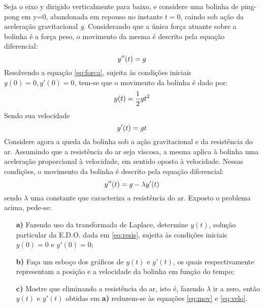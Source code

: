 \linespread{1.5}
Seja o eixo y dirigido verticalmente para baixo, e considere uma bolinha de ping-pong em y=0, abandonada em repouso no instante $t=0$, caindo sob ação da aceleração gravitacional \textit{g}. Considerando que a única força atuante sobre a bolinha é a força peso, o movimento da mesma é descrito pela equação diferencial:
\begin{equation}
    \centering
    \label{eq:forca}
    y''(t) = g
\end{equation}
Resolvendo a equação \ref{eq:forca}, sujeita às condições iniciais $y(0)=0, y'(0) = 0$, tem-se que o movimento da bolinha é dado por:
\begin{equation}
    \centering
    \label{eq:mov}
    y(t) = \frac{1}{2}gt^2
\end{equation}
Sendo sua velocidade
\begin{equation}
    \centering
    \label{eq:velo}
    y'(t) = gt
\end{equation}
Considere agora a queda da bolinha sob a ação gravitacional e da resistência do ar. Assumindo que a resistência do ar seja viscosa, a mesma aplica à bolinha uma aceleração proporcional à velocidade, em sentido oposto à velocidade. Nessas condições, o movimento da bolinha é descrito pela equação diferencial:
\begin{equation}
    \centering
    \label{eq:resis}
    y''(t) = g - \lambda y'(t)
\end{equation}
sendo $\lambda$ uma constante que caracteriza a resistência do ar. Exposto o problema acima, pede-se:
\begin{itemize}
    \item[\textbf{a)}] Fazendo uso da transformada de Laplace, determine $y(t)$, solução particular da E.D.O. dada em \ref{eq:resis}, sujeita às condições iniciais $y(0) = 0$ e $y'(0) = 0$;
    \item[\textbf{b)}] Faça um esboço dos gráficos de $y(t)$ e $y'(t)$, os quais respectivamente representam a posição e a velocidade da bolinha em função do tempo;
    \item[\textbf{c)}]Mostre que eliminando a resistência do ar, isto é, fazendo $\lambda$ ir a zero, então $y(t)$ e $y'(t)$ obtidas em \textbf{a)} reduzem-se às equações \ref{eq:mov} e \ref{eq:velo}.
\end{itemize}

